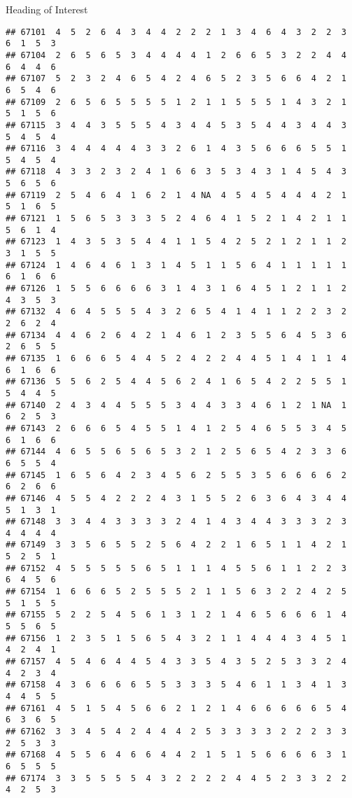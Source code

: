\documentclass[
  ignorenonframetext,
]{beamer}
\begin{document}
\begin{frame}[fragile]{Heading of Interest}
\begin{verbatim}
## 67101  4  5  2  6  4  3  4  4  2  2  2  1  3  4  6  4  3  2  2  3  6  1  5  3
## 67104  2  6  5  6  5  3  4  4  4  4  1  2  6  6  5  3  2  2  4  4  6  4  4  6
## 67107  5  2  3  2  4  6  5  4  2  4  6  5  2  3  5  6  6  4  2  1  6  5  4  6
## 67109  2  6  5  6  5  5  5  5  1  2  1  1  5  5  5  1  4  3  2  1  5  1  5  6
## 67115  3  4  4  3  5  5  5  4  3  4  4  5  3  5  4  4  3  4  4  3  5  4  5  4
## 67116  3  4  4  4  4  4  3  3  2  6  1  4  3  5  6  6  6  5  5  1  5  4  5  4
## 67118  4  3  3  2  3  2  4  1  6  6  3  5  3  4  3  1  4  5  4  3  5  6  5  6
## 67119  2  5  4  6  4  1  6  2  1  4 NA  4  5  4  5  4  4  4  2  1  5  1  6  5
## 67121  1  5  6  5  3  3  3  5  2  4  6  4  1  5  2  1  4  2  1  1  5  6  1  4
## 67123  1  4  3  5  3  5  4  4  1  1  5  4  2  5  2  1  2  1  1  2  3  1  5  5
## 67124  1  4  6  4  6  1  3  1  4  5  1  1  5  6  4  1  1  1  1  1  6  1  6  6
## 67126  1  5  5  6  6  6  6  3  1  4  3  1  6  4  5  1  2  1  1  2  4  3  5  3
## 67132  4  6  4  5  5  5  4  3  2  6  5  4  1  4  1  1  2  2  3  2  2  6  2  4
## 67134  4  4  6  2  6  4  2  1  4  6  1  2  3  5  5  6  4  5  3  6  2  6  5  5
## 67135  1  6  6  6  5  4  4  5  2  4  2  2  4  4  5  1  4  1  1  4  6  1  6  6
## 67136  5  5  6  2  5  4  4  5  6  2  4  1  6  5  4  2  2  5  5  1  5  4  4  5
## 67140  2  4  3  4  4  5  5  5  3  4  4  3  3  4  6  1  2  1 NA  1  6  2  5  3
## 67143  2  6  6  6  5  4  5  5  1  4  1  2  5  4  6  5  5  3  4  5  6  1  6  6
## 67144  4  6  5  5  6  5  6  5  3  2  1  2  5  6  5  4  2  3  3  6  6  5  5  4
## 67145  1  6  5  6  4  2  3  4  5  6  2  5  5  3  5  6  6  6  6  2  6  2  6  6
## 67146  4  5  5  4  2  2  2  4  3  1  5  5  2  6  3  6  4  3  4  4  5  1  3  1
## 67148  3  3  4  4  3  3  3  3  2  4  1  4  3  4  4  3  3  3  2  3  4  4  4  4
## 67149  3  3  5  6  5  5  2  5  6  4  2  2  1  6  5  1  1  4  2  1  5  2  5  1
## 67152  4  5  5  5  5  5  6  5  1  1  1  4  5  5  6  1  1  2  2  3  6  4  5  6
## 67154  1  6  6  6  5  2  5  5  5  2  1  1  5  6  3  2  2  4  2  5  5  1  5  5
## 67155  5  2  2  5  4  5  6  1  3  1  2  1  4  6  5  6  6  6  1  4  5  5  6  5
## 67156  1  2  3  5  1  5  6  5  4  3  2  1  1  4  4  4  3  4  5  1  4  2  4  1
## 67157  4  5  4  6  4  4  5  4  3  3  5  4  3  5  2  5  3  3  2  4  4  2  3  4
## 67158  4  3  6  6  6  6  5  5  3  3  3  5  4  6  1  1  3  4  1  3  4  4  5  5
## 67161  4  5  1  5  4  5  6  6  2  1  2  1  4  6  6  6  6  6  5  4  6  3  6  5
## 67162  3  3  4  5  4  2  4  4  4  2  5  3  3  3  3  2  2  2  3  3  2  5  3  3
## 67168  4  5  5  6  4  6  6  4  4  2  1  5  1  5  6  6  6  6  3  1  6  5  5  5
## 67174  3  3  5  5  5  5  4  3  2  2  2  2  4  4  5  2  3  3  2  2  4  2  5  3

\end{verbatim}
\end{frame}
\end{document}
